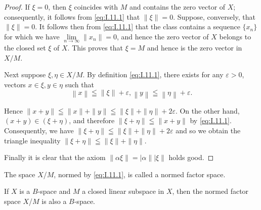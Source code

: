 \begin{proof}
 If $\xi = 0$, then $\xi$ coincides with $M$ and contains the zero vector of $X$; consequently, it follows from \eqref{eq:I.11.1} that $\|\xi\| = 0$. Suppose, conversely, that $\|\xi\| = 0$. It follows then from \eqref{eq:I.11.1} that the class contains a sequence $\{x_n\}$ for which we have $\lim\limits_{n \to \infty} \|x_n\| = 0$, and hence the zero vector of $X$ belongs to the closed set $\xi$ of $X$. This proves that $\xi = M$ and hence is the zero vector in $X/M$. 


Next suppose $\xi, \eta \in X / M$. By definition \eqref{eq:I.11.1}, there exists for any $\varepsilon > 0$, vectors $x \in \xi, y \in \eta$ such that 
\[
\left\| x \right\| \leqq \left\| \xi \right\| + \varepsilon , \left\| y \right\| \leqq \left\| \eta \right\| + \varepsilon .
\]

Hence $\|x + y\| \leqq \|x\| + \|y\| \leqq \|\xi\| + \|\eta\| + 2\varepsilon$. On the other hand, $(x + y) \in (\xi + \eta)$, and therefore $\|\xi + \eta\| \leqq \|x + y\|$ by \eqref{eq:I.11.1}. Consequently, we have $\|\xi + \eta\| \leqq \|\xi\| + \|\eta\| + 2\varepsilon$ and so we obtain the triangle inequality $\|\xi + \eta\| \leqq \|\xi\| + \|\eta\|$. 

Finally it is clear that the axiom $\|\alpha \xi \| = |\alpha \||\xi \|$ holds good.
\end{proof}

\begin{definitionu} The space $X$/$M$, normed by \eqref{eq:I.11.1}, is called a normed factor space. 
\end{definitionu}

\begin{theoremu} If $X$ is a $B$-space and $M$ a closed linear subspace in $X$, then the normed factor space $X$/$M$ is also a $B$-space. 
\end{theoremu}

